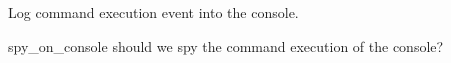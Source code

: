 Log command execution event into the console.

\begin{Configuration}

    \item[spy\_on\_console]{should we spy the command execution of the console?}

\end{Configuration}

